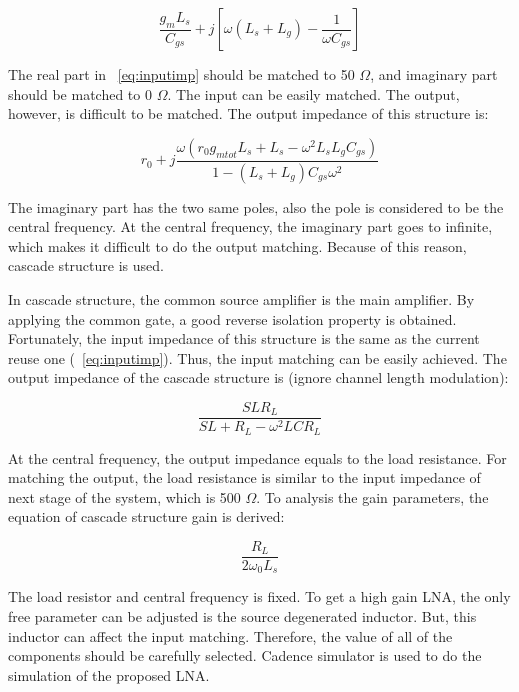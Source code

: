 \begin{equation} 
  	\frac{g_mL_s}{C_{gs}} + j[\omega (L_s+L_g) - \frac{1}{\omega C_{gs}}]
	\label{eq:inputimp}
\end{equation}

The real part in ~\ref{eq:inputimp} should be matched to 50 $\Omega$, and imaginary part should be matched to 0 $\Omega$. The input can be easily matched. The output, however, is difficult to be matched. The output impedance of this structure is:

\begin{equation} 
  	r_0 + j\frac{\omega(r_0g_{mtot}L_s+L_s-\omega^2L_sL_gC_{gs})}{1-(L_s+L_g)C_{gs}\omega^2}
\end{equation}

The imaginary part has the two same poles, also the pole is considered to be the central frequency. At the central frequency, the imaginary part goes to infinite, which makes it difficult to do the output matching. Because of this reason, cascade structure is used.

In cascade structure, the common source amplifier is the main amplifier. By applying the common gate, a good reverse isolation property is obtained. Fortunately, the input impedance of this structure is the same as the current reuse one (~\ref{eq:inputimp}). Thus, the input matching can be easily achieved. The output impedance of the cascade structure is (ignore channel length modulation):

\begin{equation} 
  	\frac{SLR_L}{SL+R_L-\omega^2LCR_L}
\end{equation}

At the central frequency, the output impedance equals to the load resistance. For matching the output, the load resistance is similar to the input impedance of next stage of the system, which is 500 $\Omega$. To analysis the gain parameters, the equation of cascade structure gain is derived: 

\begin{equation} 
  	\frac{R_L}{2\omega_0L_s}
\end{equation}

The load resistor and central frequency is fixed. To get a high gain LNA, the only free parameter can be adjusted is the source degenerated inductor. But, this inductor can affect the input matching. Therefore, the value of all of the components should be carefully selected. Cadence simulator is used to do the simulation of the proposed LNA. 

